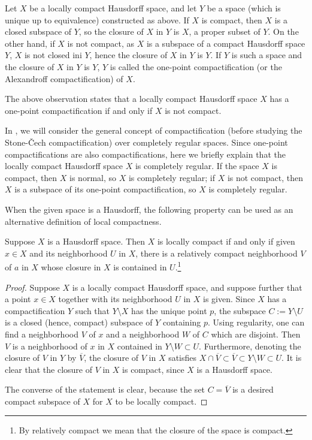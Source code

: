 Let $X$ be a locally compact Hausdorff space, and let $Y$ be a space (which is unique up to equivalence) constructed as above.
If $X$ is compact, then $X$ is a closed subspace of $Y$, so the closure of $X$ in $Y$ is $X$, a proper subset of $Y$.
On the other hand, if $X$ is not compact, as $X$ is a subspace of a compact Hausdorff space $Y$, $X$ is not closed ini $Y$, hence the closure of $X$ in $Y$ is $Y$.
If $Y$ is such a space and the closure of $X$ in $Y$ is $Y$, $Y$ is called the one-point compactification (or the Alexandroff compactification) of $X$.
\begin{rmk}
    The above observation states that a locally compact Hausdorff space $X$ has a one-point compactification if and only if $X$ is not compact.
\end{rmk}
\begin{rmk}
    In , we will consider the general concept of compactification (before studying the Stone-\v{C}ech compactification) over completely regular spaces.
    Since one-point compactifications are also compactifications, here we briefly explain that the locally compact Hausdorff space $X$ is completely regular.
    If the space $X$ is compact, then $X$ is normal, so $X$ is completely regular; if $X$ is not compact, then $X$ is a subspace of its one-point compactification, so $X$ is completely regular.
\end{rmk}

When the given space is a Hausdorff, the following property can be used as an alternative definition of local compactness.
\begin{prop}
    Suppose $X$ is a Hausdorff space.
    Then $X$ is locally compact if and only if given $x\in X$ and its neighborhood $U$ in $X$, there is a relatively compact neighborhood $V$ of $a$ in $X$ whose closure in $X$ is contained in $U$.\footnote{By relatively compact we mean that the closure of the space is compact.}
\end{prop}
\begin{proof}
    Suppose $X$ is a locally compact Hausdorff space, and suppose further that a point $x\in X$ together with its neighborhood $U$ in $X$ is given.
    Since $X$ has a compactification $Y$ such that $Y\setminus X$ has the unique point $p$, the subspace $C:=Y\setminus U$ is a closed (hence, compact) subspace of $Y$ containing $p$.
    Using regularity, one can find a neighborhood $V$ of $x$ and a neighborhood $W$ of $C$ which are disjoint.
    Then $V$ is a neighborhood of $x$ in $X$ contained in $Y\setminus W\subset U$.
    Furthermore, denoting the closure of $V$ in $Y$ by $\overline{V}$, the closure of $V$ in $X$ satisfies $X\cap\overline{V}\subset\overline{V}\subset Y\setminus W\subset U$.
    It is clear that the closure of $V$ in $X$ is compact, since $X$ is a Hausdorff space.

    The converse of the statement is clear, because the set $C=\overline{V}$ is a desired compact subspace of $X$ for $X$ to be locally compact.
\end{proof}

